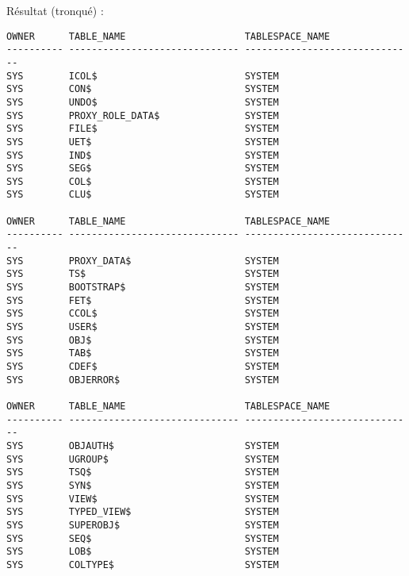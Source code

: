 \documentclass[a4paper, oneside, 12pt]{article}
\begin{document}
Résultat (tronqué) :
\begin{verbatim}
OWNER      TABLE_NAME                     TABLESPACE_NAME               
---------- ------------------------------ ------------------------------
SYS        ICOL$                          SYSTEM                        
SYS        CON$                           SYSTEM                        
SYS        UNDO$                          SYSTEM                                
SYS        PROXY_ROLE_DATA$               SYSTEM                                
SYS        FILE$                          SYSTEM                                
SYS        UET$                           SYSTEM                                
SYS        IND$                           SYSTEM                                
SYS        SEG$                           SYSTEM                                
SYS        COL$                           SYSTEM                                
SYS        CLU$                           SYSTEM

OWNER      TABLE_NAME                     TABLESPACE_NAME                       
---------- ------------------------------ ------------------------------                                        
SYS        PROXY_DATA$                    SYSTEM                                
SYS        TS$                            SYSTEM                                
SYS        BOOTSTRAP$                     SYSTEM                                
SYS        FET$                           SYSTEM                                
SYS        CCOL$                          SYSTEM                                
SYS        USER$                          SYSTEM                                
SYS        OBJ$                           SYSTEM                                
SYS        TAB$                           SYSTEM                                
SYS        CDEF$                          SYSTEM                                
SYS        OBJERROR$                      SYSTEM                               

OWNER      TABLE_NAME                     TABLESPACE_NAME                       
---------- ------------------------------ ------------------------------        
SYS        OBJAUTH$                       SYSTEM                                
SYS        UGROUP$                        SYSTEM                                
SYS        TSQ$                           SYSTEM                                
SYS        SYN$                           SYSTEM                                
SYS        VIEW$                          SYSTEM                                
SYS        TYPED_VIEW$                    SYSTEM                                
SYS        SUPEROBJ$                      SYSTEM                                
SYS        SEQ$                           SYSTEM                                
SYS        LOB$                           SYSTEM                                
SYS        COLTYPE$                       SYSTEM                                


\end{verbatim}
\end{document}
